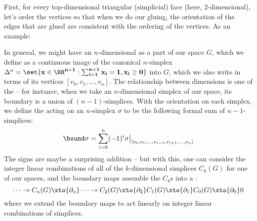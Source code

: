\documentclass[12pt]{article}
\begin{document}
First, for every top-dimensional triangular (simplicial) face (here,
2-dimensional), let's order the vertices so that when we do our gluing, the
orientation of the edges that are glued are consistent with the ordering of the
vertices. As an example:
  \begin{center}
  
  \end{center}
In general, we might have an $n$-dimensional  as a part of our
space $G$, which we define as a continuous image of the canonical $n$-simplex
$\Delta^n = \set{\bf x \in \RR^{n+1} : \sum_{i=1}^{n+1} x_i = 1, x_i \geq
0}$ into $G$, which we also write in terms of its vertices $[v_0, v_1,
\dots, v_n]$. The relationship between dimensions is one of the
 -- for instance, when we take an $n$-dimensional simplex of our
space, its boundary is a union of $(n-1)$-simplices. With the orientation on each
simplex, we define the  acting on an $n$-simplex $\sigma$ to be the
following formal sum of $n-1$-simplices: 
\[
\bound \sigma = \sum_{i=0}^n (-1)^i \sigma\big|_{[v_0, v_1, \dots, v_{i-1},
v_{i+1}, \dots, v_n]}
\]
The signs are maybe a surprising addition -- but with this, one can consider the
integer linear combinations of all of the $k$-dimensional simplices $C_k(G)$ for
one of our spaces, and the boundary maps assemble the $C_k$s into a :
\[
  \dots \to C_n(G) \xto {\partial_n} \dots \to C_2(G) \xto{\partial_2} C_1(G)
  \xto{\partial_1} C_0(G) \xto{\partial_0} 0  
\]
where we extend the boundary maps to act linearly on integer linear combinations
of simplices. 
\end{document}
